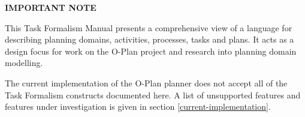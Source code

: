 






\newcommand{\M}[1]{{$\langle$#1$\rangle$}}


\parskip=6pt

\makeindex



\TitlePage
\Headers

\begin{center}
{\Large\bf IMPORTANT NOTE}
\end{center}

{\large This Task Formalism Manual presents a comprehensive view of a language
for describing planning domains, activities, processes, tasks and plans.
It acts as a design focus for work on the O-Plan project and research
into planning domain modelling.

The current implementation of the O-Plan planner does not accept all of
the Task Formalism constructs documented here.  A list of unsupported
features and features under investigation is given in section
\ref{current-implementation}.
}
\newpage

